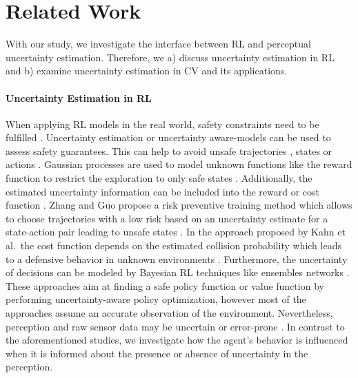 \section{Related Work}
With our study, we investigate the interface between RL and perceptual uncertainty estimation. Therefore, we a) discuss uncertainty estimation in RL and b) examine uncertainty estimation in CV and its applications.

\paragraph{Uncertainty Estimation in RL}
When applying RL models in the real world, safety constraints need to be fulfilled \cite{10675394}. Uncertainty estimation or uncertainty aware-models \cite{DBLP:journals/corr/KahnVPAL17,8793611,zhang2022safereinforcementlearningcontrastive,thomas2021safe} can be used to assess safety guarantees. 
This can help to avoid unsafe trajectories \cite{thomas2021safe}, states 
\cite{pmlr-v37-sui15,wachi2018safeexploration} or actions 
\cite{zhang2022safereinforcementlearningcontrastive}. Gaussian processes are used to model unknown functions like the reward function to restrict the exploration to only safe states \cite{pmlr-v37-sui15,wachi2018safeexploration}. 
Additionally, the estimated uncertainty information can be included into the reward \cite{zhang2022safereinforcementlearningcontrastive} or cost function \cite{DBLP:journals/corr/KahnVPAL17}. 
Zhang and Guo propose a risk preventive training method which allows to choose trajectories with a low risk based on an uncertainty estimate for a state-action pair leading to unsafe states \cite{zhang2022safereinforcementlearningcontrastive}. In the approach proposed by Kahn et al.\ the cost function depends on the estimated collision probability which leads to a defensive behavior in unknown environments \cite{DBLP:journals/corr/KahnVPAL17}.
Furthermore, the uncertainty of decisions can be modeled by Bayesian RL techniques like ensembles networks \cite{hoel2020tactical,Zhang2024SafeReinforcmentLearning}.
These approaches aim at finding a safe policy function or value function by performing uncertainty-aware policy optimization, however most of the approaches assume an accurate observation of the environment.
Nevertheless, perception and raw sensor data may be uncertain or error-prone \cite{kendall2017uncertaintiesneedbayesiandeep}.
In contrast to the aforementioned studies, we investigate how the agent's behavior is influenced when it is informed about the presence or absence of uncertainty in the perception.

